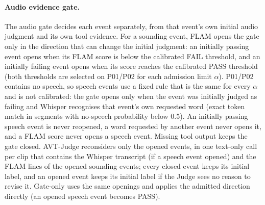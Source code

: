 
\paragraph{Audio evidence gate.}
The audio gate decides each event separately, from that event's own initial audio judgment and its own tool evidence.
For a sounding event, FLAM opens the gate only in the direction that can change the initial judgment: an initially passing event opens when its FLAM score is below the calibrated FAIL threshold, and an initially failing event opens when its score reaches the calibrated PASS threshold (both thresholds are selected on P01/P02 for each admission limit $\alpha$).
P01/P02 contains no speech, so speech events use a fixed rule that is the same for every $\alpha$ and is not calibrated: the gate opens only when the event was initially judged as failing and Whisper recognises that event's own requested word (exact token match in segments with no-speech probability below 0.5).
An initially passing speech event is never reopened, a word requested by another event never opens it, and a FLAM score never opens a speech event.
Missing tool output keeps the gate closed.
AVT-Judge reconsiders only the opened events, in one text-only call per clip that contains the Whisper transcript (if a speech event opened) and the FLAM lines of the opened sounding events; every closed event keeps its initial label, and an opened event keeps its initial label if the Judge sees no reason to revise it.
Gate-only uses the same openings and applies the admitted direction directly (an opened speech event becomes PASS).


